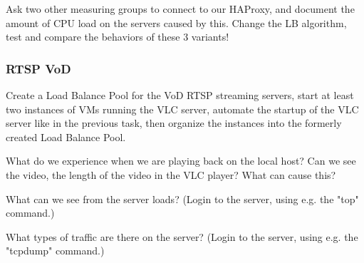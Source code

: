 \documentclass[a4paper]{article}
\begin{document}
\noindent{}Ask two other measuring groups to connect to our HAProxy, and document the amount of CPU load on the servers caused by this.
Change the LB algorithm, test and compare the behaviors of these 3 variants!

\subsubsection{RTSP VoD}

Create a Load Balance Pool for the VoD RTSP streaming servers, start at least two instances of VMs running the VLC server, automate the startup of the VLC server like in the previous task, then organize the instances into the formerly created Load Balance Pool.

\noindent{}What do we experience when we are playing back on the local host? Can we see the video, the length of the video in the VLC player? What can cause this?

\noindent{}What can we see from the server loads? (Login to the server, using e.g. the "top" command.)

\noindent{}What types of traffic are there on the server? (Login to the server, using e.g. the "tcpdump" command.)
\end{document}

